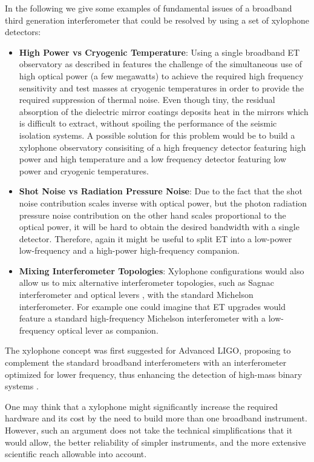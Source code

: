 In the following we give some examples of
fundamental issues of a broadband third generation interferometer that could be
resolved by using a set of xylophone detectors:
\begin{itemize}
\item \textbf{High Power vs Cryogenic Temperature}: Using a single broadband
ET observatory as described in \cite{HildETconventional} features the challenge of the
simultaneous use of high optical power (a few megawatts) to achieve the 
required high frequency sensitivity and test masses at cryogenic temperatures in 
order to provide the required suppression of thermal noise.
Even though tiny, the residual absorption of the
dielectric mirror coatings deposits heat in the mirrors which is difficult to extract,
without spoiling the performance of the seismic isolation systems. A possible
solution for this problem would be to build a xylophone observatory consisiting
of a high frequency detector featuring high power and high temperature and a
low frequency detector featuring low power and cryogenic temperatures.
\item \textbf{Shot Noise vs Radiation Pressure Noise}: Due to the fact that the shot 
noise contribution scales inverse with optical power, but the photon radiation
pressure noise contribution on the other hand  scales proportional to the optical power, it will be hard to obtain the desired bandwidth with a 
single detector. Therefore, again it might be useful
to split ET into a low-power low-frequency and a high-power high-frequency
companion.
\item \textbf{Mixing Interferometer Topologies}: Xylophone configurations would
also allow us to mix alternative interferometer topologies, such as Sagnac interferometer
\cite{Chen2003} and optical levers \cite{Khalili2002}, with the standard Michelson
 interferometer. For example one
could imagine that ET upgrades would feature a standard high-frequency Michelson interferometer
with a low-frequency optical lever as companion.
\end{itemize}

The xylophone concept was first suggested for Advanced LIGO,
 proposing to complement the standard broadband
 interferometers with an interferometer optimized for lower frequency,
 thus enhancing the detection of high-mass binary systems
\cite{Shoemaker2001LIGOXylophone, Conforto2004}.

One may think that a xylophone might significantly increase the required
hardware and its cost by the need to build more than one
 broadband instrument. However, such an argument
 does not take the technical
simplifications that it would allow, the better reliability of simpler instruments,
 and the more extensive scientific reach allowable into account.


